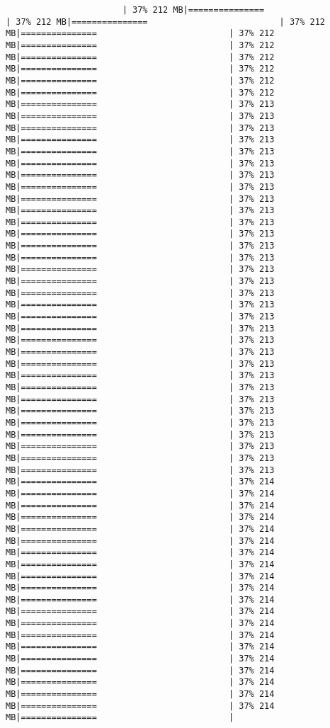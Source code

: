 \documentclass[
]{article}
\begin{document}
\begin{verbatim}
                       | 37% 212 MB|===============                          | 37% 212 MB|===============                          | 37% 212 MB|===============                          | 37% 212 MB|===============                          | 37% 212 MB|===============                          | 37% 212 MB|===============                          | 37% 212 MB|===============                          | 37% 212 MB|===============                          | 37% 212 MB|===============                          | 37% 213 MB|===============                          | 37% 213 MB|===============                          | 37% 213 MB|===============                          | 37% 213 MB|===============                          | 37% 213 MB|===============                          | 37% 213 MB|===============                          | 37% 213 MB|===============                          | 37% 213 MB|===============                          | 37% 213 MB|===============                          | 37% 213 MB|===============                          | 37% 213 MB|===============                          | 37% 213 MB|===============                          | 37% 213 MB|===============                          | 37% 213 MB|===============                          | 37% 213 MB|===============                          | 37% 213 MB|===============                          | 37% 213 MB|===============                          | 37% 213 MB|===============                          | 37% 213 MB|===============                          | 37% 213 MB|===============                          | 37% 213 MB|===============                          | 37% 213 MB|===============                          | 37% 213 MB|===============                          | 37% 213 MB|===============                          | 37% 213 MB|===============                          | 37% 213 MB|===============                          | 37% 213 MB|===============                          | 37% 213 MB|===============                          | 37% 213 MB|===============                          | 37% 213 MB|===============                          | 37% 213 MB|===============                          | 37% 213 MB|===============                          | 37% 214 MB|===============                          | 37% 214 MB|===============                          | 37% 214 MB|===============                          | 37% 214 MB|===============                          | 37% 214 MB|===============                          | 37% 214 MB|===============                          | 37% 214 MB|===============                          | 37% 214 MB|===============                          | 37% 214 MB|===============                          | 37% 214 MB|===============                          | 37% 214 MB|===============                          | 37% 214 MB|===============                          | 37% 214 MB|===============                          | 37% 214 MB|===============                          | 37% 214 MB|===============                          | 37% 214 MB|===============                          | 37% 214 MB|===============                          | 37% 214 MB|===============                          | 37% 214 MB|===============                          | 37% 214 MB|===============                          | 
\end{verbatim}
\end{document}

